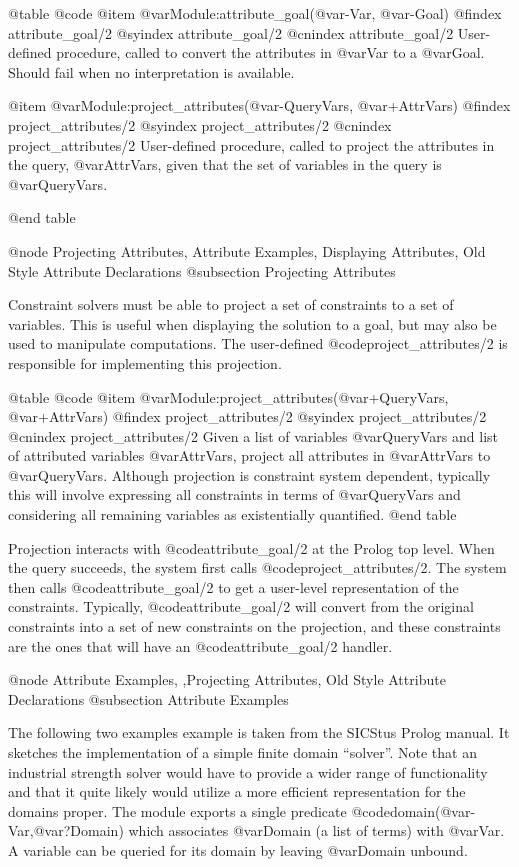{{{{{{{{{@table @code
@item @var{Module}:attribute_goal(@var{-Var}, @var{-Goal})
@findex attribute_goal/2
@syindex attribute_goal/2
@cnindex attribute_goal/2
User-defined procedure, called to convert the attributes in @var{Var} to
a @var{Goal}. Should fail when no interpretation is available.

@item @var{Module}:project_attributes(@var{-QueryVars}, @var{+AttrVars})
@findex project_attributes/2
@syindex project_attributes/2
@cnindex project_attributes/2
User-defined procedure, called to project the attributes in the query,
@var{AttrVars}, given that the set of variables in the query is
@var{QueryVars}.

@end table

@node Projecting Attributes, Attribute Examples, Displaying Attributes, Old Style Attribute Declarations
@subsection Projecting Attributes

Constraint solvers must be able to project a set of constraints to a set
of variables. This is useful when displaying the solution to a goal, but
may also be used to manipulate computations. The user-defined
@code{project_attributes/2} is responsible for implementing this
projection.


@table @code
@item @var{Module}:project_attributes(@var{+QueryVars}, @var{+AttrVars})
@findex project_attributes/2
@syindex project_attributes/2
@cnindex project_attributes/2
Given a list of variables @var{QueryVars} and list of attributed
variables @var{AttrVars}, project all attributes in @var{AttrVars} to
@var{QueryVars}. Although projection is constraint system dependent,
typically this will involve expressing all constraints in terms of
@var{QueryVars} and considering all remaining variables as existentially
quantified.
@end table

Projection interacts with @code{attribute_goal/2} at the Prolog top
level. When the query succeeds, the system first calls
@code{project_attributes/2}. The system then calls
@code{attribute_goal/2} to get a user-level representation of the
constraints. Typically, @code{attribute_goal/2} will convert from the
original constraints into a set of new constraints on the projection,
and these constraints are the ones that will have an
@code{attribute_goal/2} handler.

@node Attribute Examples, ,Projecting Attributes, Old Style Attribute Declarations
@subsection Attribute Examples

The following two examples example is taken from the SICStus Prolog manual. It
sketches the implementation of a simple finite domain ``solver''.  Note
that an industrial strength solver would have to provide a wider range
of functionality and that it quite likely would utilize a more efficient
representation for the domains proper.  The module exports a single
predicate @code{domain(@var{-Var},@var{?Domain})} which associates
@var{Domain} (a list of terms) with @var{Var}.  A variable can be
queried for its domain by leaving @var{Domain} unbound.

}}}}}}}}}
